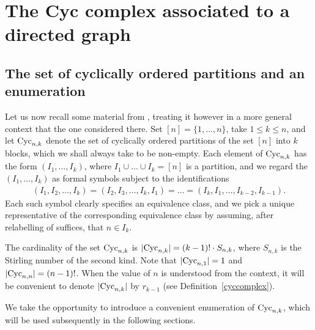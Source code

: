\documentclass[ALCO]{cedram}
\newcommand{\cyc}{\mbox{${\rm Cyc}$}}
\begin{document}
\section{The Cyc complex associated to a directed graph}

\subsection{The set of cyclically ordered partitions and an 
enumeration}\label{thesetcyc}

 Let us now recall some material from \cite[Section~2]{ms},
treating it however in a more general context that the one considered
there. Set $[n]=\{1,\ldots ,n\}$, take $1\leq k\leq n$, and let
$\cyc_{n,k}$ denote the set of cyclically ordered partitions of the
set $[n]$ into $k$ blocks, which we shall always take to be
non-empty. Each element of $\cyc_{n,k}$ has the form $(I_1,\ldots
,I_k)$, where $I_1\cup\ldots\cup I_k=[n]$ is a partition, and we
regard the $(I_1,\ldots ,I_k)$ as formal symbols subject to the
identifications
\begin{eqnarray*}
(I_1,I_2,\ldots ,I_k)=(I_2,I_3,\ldots
  ,I_k,I_1)=\ldots=(I_k,I_1,\ldots,I_{k-2},I_{k-1}).
\end{eqnarray*}
Each such symbol clearly specifies an equivalence class, and we pick a
unique representative of the corresponding equivalence class by
assuming, after relabelling of suffices, that $n\in I_k$.

The cardinality of the set $\cyc_{n,k}$ is $\lvert
\cyc_{n,k}\rvert=(k-1)!\cdot S_{n,k}$, where $S_{n,k}$ is the Stirling
number of the second kind. Note that $\lvert \cyc_{n,1}\rvert=1$ and
$\lvert \cyc_{n,n}\rvert=(n-1)!$. When the value of $n$ is understood
from the context, it will be convenient to denote
$\lvert\cyc_{n,k}\rvert$ by $r_{k-1}$ (see
Definition~\ref{cyccomplex}).

We take the opportunity to introduce a convenient enumeration of
$\cyc_{n,k}$, which will be used subsequently in the following
sections.
\end{document}
